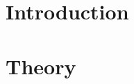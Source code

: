 \documentclass[letterpaper,12pt]{report}
\begin{document}

\tableofcontents

\chapter{Introduction}

%
\chapter{Theory}



\label{endtext} 
\printbibliography
\end{document}
